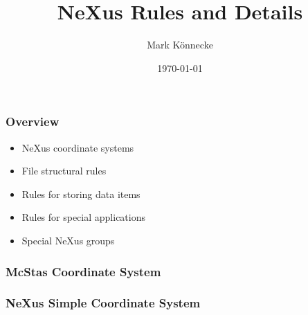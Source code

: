 \documentclass{beamer}
\title{NeXus Rules and Details }
\author{Mark K\"onnecke }
\institute{Paul Scherrer Institute\\Switzerland }
\date{\today}
\begin{document}
\begin{frame}
\titlepage
\end{frame}

\begin{frame}
\frametitle{Overview}
\begin{itemize}
\item NeXus coordinate systems 
\item File structural rules
\item Rules for storing data items
\item Rules for special applications
\item Special NeXus groups
\end{itemize}
\end{frame}

\begin{frame} \frametitle{McStas Coordinate System }
\begin{figure}[!ht]
\end{figure}
\end{frame}

\begin{frame} \frametitle{NeXus Simple Coordinate System }
\begin{figure}[!ht]
\end{figure}
\end{frame}
\end{document}
